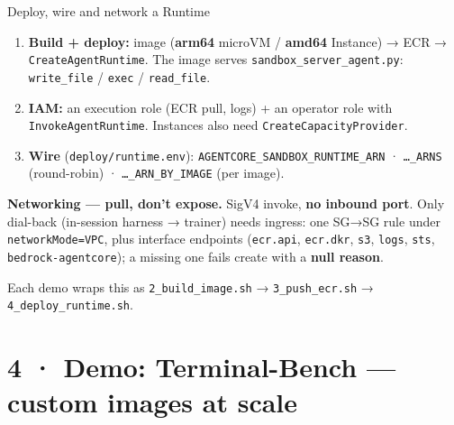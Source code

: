 \documentclass[
  10pt,
  ignorenonframetext,
  aspectratio=169,
  t]{beamer}
\providecommand{\tightlist}{%
  \setlength{\itemsep}{0pt}\setlength{\parskip}{0pt}}
\begin{document}
\begin{frame}{Deploy, wire and network a Runtime}
\protect\hypertarget{deploy-wire-and-network-a-runtime}{}
\begin{enumerate}
\tightlist
\item
  \textbf{Build + deploy:} image (\textbf{arm64} microVM /
  \textbf{amd64} Instance) → ECR → \texttt{CreateAgentRuntime}. The
  image serves \texttt{sandbox\_server\_agent.py}: \texttt{write\_file}
  / \texttt{exec} / \texttt{read\_file}.
\item
  \textbf{IAM:} an execution role (ECR pull, logs) + an operator role
  with \texttt{InvokeAgentRuntime}. Instances also need
  \texttt{CreateCapacityProvider}.
\item
  \textbf{Wire} (\texttt{deploy/runtime.env}):
  \texttt{AGENTCORE\_SANDBOX\_RUNTIME\_ARN} · \texttt{…\_ARNS}
  (round-robin) · \texttt{…\_ARN\_BY\_IMAGE} (per image).
\end{enumerate}

\textbf{Networking --- pull, don't expose.} SigV4 invoke, \textbf{no
inbound port}. Only dial-back (in-session harness → trainer) needs
ingress: one SG→SG rule under \texttt{networkMode=VPC}, plus interface
endpoints (\texttt{ecr.api}, \texttt{ecr.dkr}, \texttt{s3},
\texttt{logs}, \texttt{sts}, \texttt{bedrock-agentcore}); a missing one
fails create with a \textbf{null reason}.

Each demo wraps this as \texttt{2\_build\_image.sh} →
\texttt{3\_push\_ecr.sh} → \texttt{4\_deploy\_runtime.sh}.
\end{frame}

\hypertarget{demo-terminal-bench-custom-images-at-scale}{%
\section{4 · Demo: Terminal-Bench --- custom images at
scale}\label{demo-terminal-bench-custom-images-at-scale}}
\end{document}
